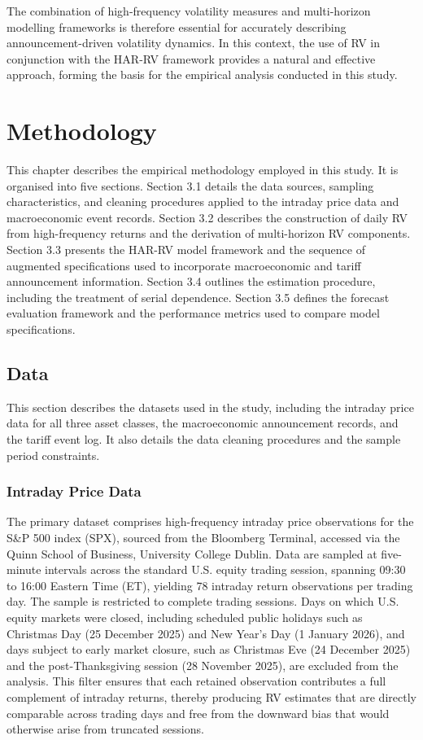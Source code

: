 \documentclass[12pt,a4paper]{report}
\begin{document}
The combination of high-frequency volatility measures and multi-horizon modelling frameworks is therefore essential for accurately describing announcement-driven volatility dynamics. In this context, the use of RV in conjunction with the HAR-RV framework provides a natural and effective approach, forming the basis for the empirical analysis conducted in this study.

\chapter{Methodology}
This chapter describes the empirical methodology employed in this study. It is organised into five sections. Section 3.1 details the data sources, sampling characteristics, and cleaning procedures applied to the intraday price data and macroeconomic event records. Section 3.2 describes the construction of daily RV from high-frequency returns and the derivation of multi-horizon RV components. Section 3.3 presents the HAR-RV model framework and the sequence of augmented specifications used to incorporate macroeconomic and tariff announcement information. Section 3.4 outlines the estimation procedure, including the treatment of serial dependence. Section 3.5 defines the forecast evaluation framework and the performance metrics used to compare model specifications.


\section{Data}
This section describes the datasets used in the study, including the intraday price data for all three asset classes, the macroeconomic announcement records, and the tariff event log. It also details the data cleaning procedures and the sample period constraints.

\subsection{Intraday Price Data}

The primary dataset comprises high-frequency intraday price observations for the S\&P 500 index (SPX), sourced from the Bloomberg Terminal, accessed via the Quinn School of Business, University College Dublin. Data are sampled at five-minute intervals across the standard U.S. equity trading session, spanning 09:30 to 16:00 Eastern Time (ET), yielding 78 intraday return observations per trading day. The sample is restricted to complete trading sessions. Days on which U.S. equity markets were closed, including scheduled public holidays such as Christmas Day (25 December 2025) and New Year's Day (1 January 2026), and days subject to early market closure, such as Christmas Eve (24 December 2025) and the post-Thanksgiving session (28 November 2025), are excluded from the analysis. This filter ensures that each retained observation contributes a full complement of intraday returns, thereby producing RV estimates that are directly comparable across trading days and free from the downward bias that would otherwise arise from truncated sessions.
\end{document}
